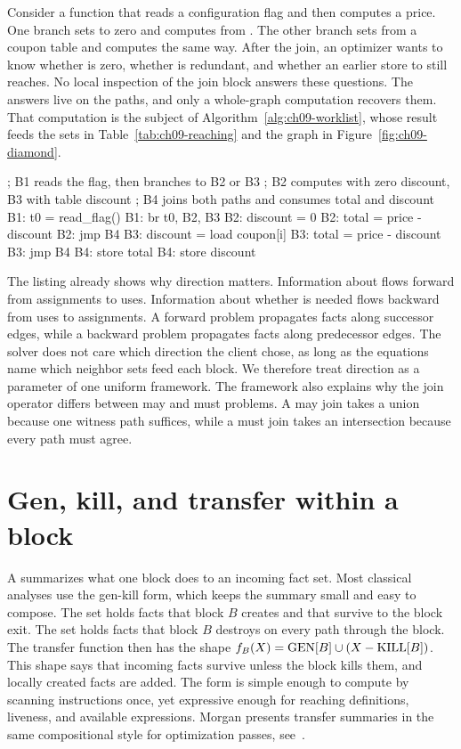 Consider a function that reads a configuration flag and then computes a price.
One branch sets  to zero and computes  from .
The other branch sets  from a coupon table and computes  the same way.
After the join, an optimizer wants to know whether  is zero, whether  is redundant, and whether an earlier store to  still reaches.
No local inspection of the join block answers these questions.
The answers live on the paths, and only a whole-graph computation recovers them.
That computation is the subject of Algorithm~\ref{alg:ch09-worklist}, whose result feeds the sets in Table~\ref{tab:ch09-reaching} and the graph in Figure~\ref{fig:ch09-diamond}.

\begin{irlisting}
; B1 reads the flag, then branches to B2 or B3
; B2 computes with zero discount, B3 with table discount
; B4 joins both paths and consumes total and discount
B1: t0 = read_flag()
B1: br t0, B2, B3
B2: discount = 0
B2: total = price - discount
B2: jmp B4
B3: discount = load coupon[i]
B3: total = price - discount
B3: jmp B4
B4: store total
B4: store discount
\end{irlisting}

The listing already shows why direction matters.
Information about  flows forward from assignments to uses.
Information about whether  is needed flows backward from uses to assignments.
A forward problem propagates facts along successor edges, while a backward problem propagates facts along predecessor edges.
The solver does not care which direction the client chose, as long as the equations name which neighbor sets feed each block.
We therefore treat direction as a parameter of one uniform framework.
The framework also explains why the join operator differs between may and must problems.
A may join takes a union because one witness path suffices, while a must join takes an intersection because every path must agree.

\section{Gen, kill, and transfer within a block}
\label{sec:ch09-gen-kill}

A  summarizes what one block does to an incoming fact set.
Most classical analyses use the gen-kill form, which keeps the summary small and easy to compose.
The set  holds facts that block $B$ creates and that survive to the block exit.
The set  holds facts that block $B$ destroys on every path through the block.
The transfer function then has the shape $f_{B}(X) = \mathrm{GEN}[B] \cup (X - \mathrm{KILL}[B])$.
This shape says that incoming facts survive unless the block kills them, and locally created facts are added.
The form is simple enough to compute by scanning instructions once, yet expressive enough for reaching definitions, liveness, and available expressions.
Morgan presents transfer summaries in the same compositional style for optimization passes, see~\cite{morgan-1998-optimizing}.

